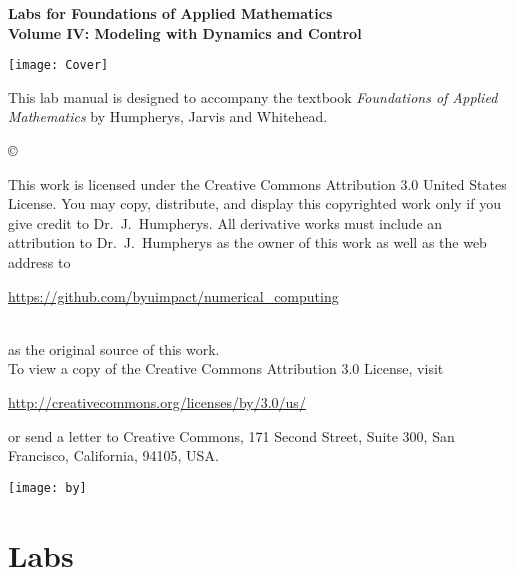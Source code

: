 \documentclass[nociteref]{SIAM-GH-book}
\begin{document}
\thispagestyle{empty}
\begin{center}
{\huge \bf Labs for Foundations of Applied Mathematics} \\
\vspace{5mm}
{\Large \bf Volume IV: Modeling with
Dynamics and Control}
\vspace{20mm}

\texttt{[image: Cover]}
\end{center}
\frontmatter




\begin{thepreface}
This lab manual is designed to accompany the textbook \emph{Foundations of Applied Mathematics} by Humpherys, Jarvis and Whitehead.

\vfill
\copyright{This work is licensed under the Creative Commons Attribution 3.0 United States 
License.  You may copy, distribute, and display this copyrighted work only if you give 
credit to Dr.~J.~Humpherys. All derivative works must include an attribution to Dr.~J.~Humpherys as the owner of this work as well as the web address to 
\\\centerline{\url{https://github.com/byuimpact/numerical_computing}}\\ as the original source of 
this 
work.\\To view a copy of the Creative Commons Attribution 3.0 License, 
visit\\\centerline{\url{http://creativecommons.org/licenses/by/3.0/us/}} or send a letter to 
Creative Commons, 171 Second Street, Suite 300, San Francisco, California, 94105, USA.}

\vfill
\centering\texttt{[image: by]}
\vfill
\end{thepreface}

\setcounter{tocdepth}{1}
\tableofcontents

\mainmatter

\part{Labs}
\end{document}
